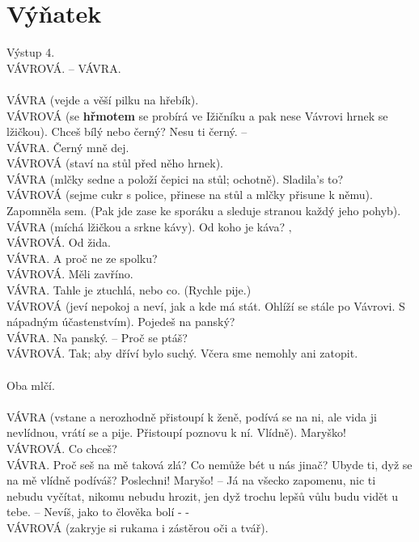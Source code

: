 \documentclass[10pt,a4paper]{article}
\newcommand{\n}[1]{\marginnote{\hspace{-0.6\textwidth}#1}}
\begin{document}
\section*{Výňatek}
Výstup 4.  \\
VÁVROVÁ. – VÁVRA. \\
 \\
VÁVRA (vejde a věší pilku na hřebík). \n{scénická poznámka}\\
VÁVROVÁ (se \textbf{hřmotem} se probírá ve Ižičníku a pak nese Vávrovi hrnek se lžičkou). Chceš bílý nebo černý? Nesu ti černý. – \n{onomatopoie}\\
VÁVRA. Černý mně dej.\\
VÁVROVÁ (staví na stůl před něho hrnek).\\
VÁVRA (mlčky sedne a položí čepici na stůl; ochotně). Sladila’s to?\\
VÁVROVÁ (sejme cukr s police, přinese na stůl a mlčky přisune k němu). Zapomněla sem. (Pak jde zase ke sporáku a sleduje stranou každý jeho pohyb).\\
VÁVRA (míchá lžičkou a srkne kávy). Od koho je káva? ‚\\
VÁVROVÁ. Od žida.\\
VÁVRA. A proč ne ze spolku?\\
VÁVROVÁ. Měli zavříno.\\
VÁVRA. Tahle je ztuchlá, nebo co. (Rychle pije.)\\
VÁVROVÁ (jeví nepokoj a neví, jak a kde má stát. Ohlíží se stále po Vávrovi. S nápadným účastenstvím). Pojedeš na panský?\\
VÁVRA. Na panský. – Proč se ptáš?\\
VÁVROVÁ. Tak; aby dříví bylo suchý. Včera sme nemohly ani zatopit.\\
 \\
Oba mlčí.\\
 \\
VÁVRA (vstane a nerozhodně přistoupí k ženě, podívá se na ni, ale vida ji nevlídnou, vrátí se a pije. Přistoupí poznovu k ní. Vlídně). Maryško!\\
VÁVROVÁ. Co chceš?\\
VÁVRA. Proč seš na mě taková zlá? Co nemůže bét u nás jinač? Ubyde ti, dyž se na mě vlídně podíváš? Poslechni! Maryšo! – Já na všecko zapomenu, nic ti nebudu vyčítat, nikomu nebudu hrozit, jen dyž trochu lepšů vůlu budu vidět u tebe. – Nevíš, jako to člověka bolí - - \\
VÁVROVÁ (zakryje si rukama i zástěrou oči a tvář).\\
 \\
\end{document}
